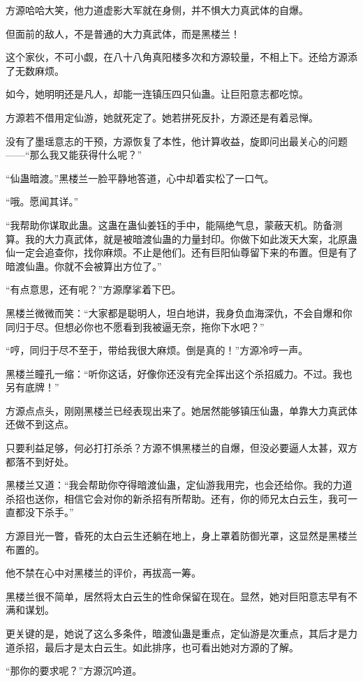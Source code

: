 \begin{this_body}
方源哈哈大笑，他力道虚影大军就在身侧，并不惧大力真武体的自爆。

但面前的敌人，不是普通的大力真武体，而是黑楼兰！

这个家伙，不可小觑，在八十八角真阳楼多次和方源较量，不相上下。还给方源添了无数麻烦。

如今，她明明还是凡人，却能一连镇压四只仙蛊。让巨阳意志都吃惊。

方源若不借用定仙游，她就死定了。她若拼死反扑，方源还是有着忌惮。

没有了墨瑶意志的干预，方源恢复了本性，他计算收益，旋即问出最关心的问题——“那么我又能获得什么呢？”

“仙蛊暗渡。”黑楼兰一脸平静地答道，心中却着实松了一口气。

“哦。愿闻其详。”

“我帮助你谋取此蛊。这蛊在蛊仙姜钰的手中，能隔绝气息，蒙蔽天机。防备测算。我的大力真武体，就是被暗渡仙蛊的力量封印。你做下如此泼天大案，北原蛊仙一定会追查你，找你麻烦。不止是他们。还有巨阳仙尊留下来的布置。但是有了暗渡仙蛊。你就不会被算出方位了。”

“有点意思，还有呢？”方源摩挲着下巴。

黑楼兰微微而笑：“大家都是聪明人，坦白地讲，我身负血海深仇，不会自爆和你同归于尽。但想必你也不愿看到我被逼无奈，拖你下水吧？”

“哼，同归于尽不至于，带给我很大麻烦。倒是真的！”方源冷哼一声。

黑楼兰瞳孔一缩：“听你这话，好像你还没有完全挥出这个杀招威力。不过。我也另有底牌！”

方源点点头，刚刚黑楼兰已经表现出来了。她居然能够镇压仙蛊，单靠大力真武体还做不到这点。

只要利益足够，何必打打杀杀？方源不惧黑楼兰的自爆，但没必要逼人太甚，双方都落不到好处。

黑楼兰又道：“我会帮助你夺得暗渡仙蛊，定仙游我用完，也会还给你。我的力道杀招也送你，相信它会对你的新杀招有所帮助。还有，你的师兄太白云生，我可一直都没下杀手。”

方源目光一瞥，昏死的太白云生还躺在地上，身上罩着防御光罩，这显然是黑楼兰布置的。

他不禁在心中对黑楼兰的评价，再拔高一筹。

黑楼兰很不简单，居然将太白云生的性命保留在现在。显然，她对巨阳意志早有不满和谋划。

更关键的是，她说了这么多条件，暗渡仙蛊是重点，定仙游是次重点，其后才是力道杀招，最后才是太白云生。如此排序，也可看出她对方源的了解。

“那你的要求呢？”方源沉吟道。


\end{this_body}
